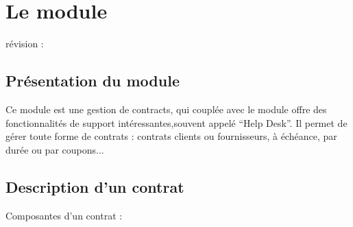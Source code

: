 
\clearpage
\section{Le module \contract}

révision : 

\subsection{Présentation du module \contract}

Ce module est une gestion de contracts, qui couplée avec le module \incident offre des fonctionnalités de support intéressantes,souvent appelé ``Help Desk''.
Il permet de gérer toute forme de contrats : contrats clients ou fournisseurs, à échéance, par durée ou par coupons...

\subsection{Description d'un contrat}

Composantes d'un contrat :\\

